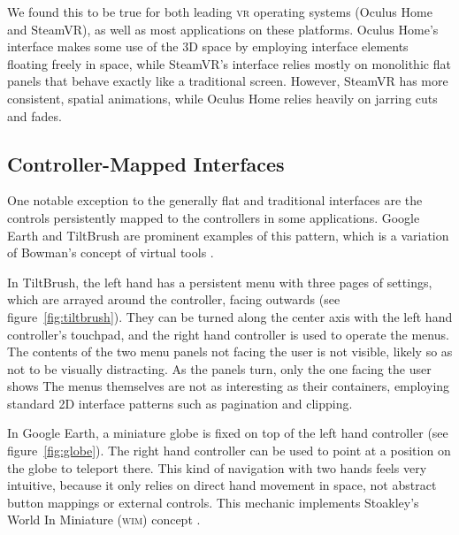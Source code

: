 \documentclass[nobib]{tufte-book} %
\begin{document}
We found this to be true for both leading \textsc{vr} operating systems (Oculus Home and SteamVR), as well as most applications on these platforms. Oculus Home's interface makes some use of the 3D space by employing interface elements floating freely in space, while SteamVR's interface relies mostly on monolithic flat panels that behave exactly like a traditional screen. However, SteamVR has more consistent, spatial animations, while Oculus Home relies heavily on jarring cuts and fades.

\subsection{Controller-Mapped Interfaces}
One notable exception to the generally flat and traditional interfaces are the controls persistently mapped to the controllers in some applications. Google Earth and TiltBrush are prominent examples of this pattern, which is a variation of Bowman's concept of virtual tools \cite[-1cm]{bowman1995user}.

In TiltBrush, the left hand has a persistent menu with three pages of settings, which are arrayed around the controller, facing outwards (see figure~\ref{fig:tiltbrush}). They can be turned along the center axis with the left hand controller's touchpad, and the right hand controller is used to operate the menus.
The contents of the two menu panels not facing the user is not visible, likely so as not to be visually distracting. As the panels turn, only the one facing the user shows
The menus themselves are not as interesting as their containers, employing standard 2D interface patterns such as pagination and clipping.

In Google Earth, a miniature globe is fixed on top of the left hand controller (see figure~\ref{fig:globe}). The right hand controller can be used to point at a position on the globe to teleport there. This kind of navigation with two hands feels very intuitive, because it only relies on direct hand movement in space, not abstract button mappings or external controls. This mechanic implements Stoakley's World In Miniature (\textsc{wim}) concept \cite[-2cm]{stoakley1995virtual}.
\end{document}

